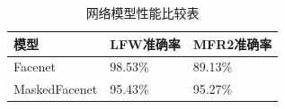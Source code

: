 \begin{table}[H]
    \centering
    \caption{网络模型性能比较表}
    \label{tab:mdcprs}
    \begin{tabularx}{.95\textwidth}{X<{\centering}X<{\centering}X<{\centering}}
        \toprule
        模型 & LFW准确率 & MFR2准确率 \\
        \midrule
        Facenet & 98.53\% & 89.13\% \\
        MaskedFacenet & 95.43\% & 95.27\% \\
        \bottomrule
    \end{tabularx}
\end{table}
